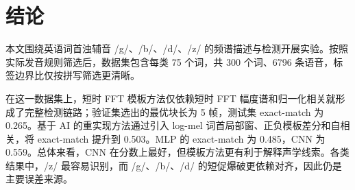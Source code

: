 \section{结论}

本文围绕英语词首浊辅音 /g/、/b/、/d/、/z/ 的频谱描述与检测开展实验。按照实际发音规则筛选后，数据集包含每类 75 个词，共 300 个词、6796 条语音，标签边界比仅按拼写筛选更清晰。

在这一数据集上，短时 FFT 模板方法仅依赖短时 FFT 幅度谱和归一化相关就形成了完整检测链路；验证集选出的最优块长为 5 帧，测试集 exact-match 为 0.265。基于 AI 的重实现方法通过引入 log-mel 词首局部窗、正负模板差分和自相关，将 exact-match 提升到 0.503。MLP 的 exact-match 为 0.485，CNN 为 0.559。总体来看，CNN 在分数上最好，但模板方法更有利于解释声学线索。各类结果中，/z/ 最容易识别，而 /g/、/b/、/d/ 的短促爆破更依赖对齐，因此仍是主要误差来源。

